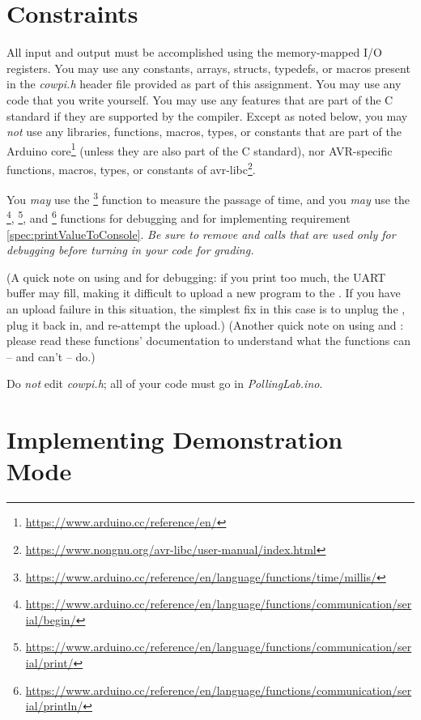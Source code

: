 \section{Constraints}\label{sec:Constraints}

All input and output must be accomplished using the memory-mapped I/O
registers. You may use any constants, arrays, structs, typedefs, or macros
present in the \textit{cowpi.h} header file provided as part of this
assignment. You may use any code that you write yourself. You may use any
features that are part of the C standard if they are supported by the
compiler. Except as noted below, you may \textit{not} use any libraries,
functions, macros, types, or constants that are part of the Arduino
core\footnote{\url{https://www.arduino.cc/reference/en/}} (unless they are
also part of the C standard), nor AVR-specific functions, macros, types, or
constants of avr-libc\footnote{\url{https://www.nongnu.org/avr-libc/user-manual/index.html}}.

You \textit{may} use the
\footnote{\url{https://www.arduino.cc/reference/en/language/functions/time/millis/}}
function to measure the passage of time, and you \textit{may} use the
\footnote{\url{https://www.arduino.cc/reference/en/language/functions/communication/serial/begin/}},
\footnote{\url{https://www.arduino.cc/reference/en/language/functions/communication/serial/print/}}, and
\footnote{\url{https://www.arduino.cc/reference/en/language/functions/communication/serial/println/}} functions for debugging
and for implementing requirement \ref{spec:printValueToConsole}. \textit{Be
sure to remove  and  calls that are used
only for debugging before turning in your code for grading.}

(A quick note on using  and  for
debugging: if you print too much, the UART buffer may fill, making it
difficult to upload a new program to the \nano. If you have an upload
failure in this situation, the simplest fix in this case is to unplug the
\nano, plug it back in, and re-attempt the upload.) (Another quick note on
using  and : please read these functions'
documentation to understand what the functions can -- and can't -- do.)

Do \textit{not} edit \textit{cowpi.h}; all of your code must go in
\textit{PollingLab.ino}.

\section{Implementing Demonstration Mode} \label{sec:DemonstrationMode}

